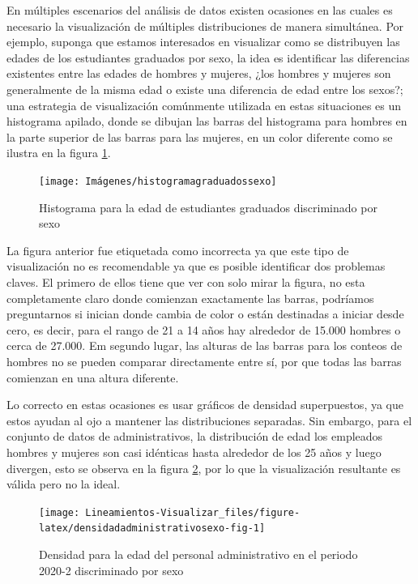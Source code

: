 \documentclass[
]{book}
\begin{document}
En múltiples escenarios del análisis de datos existen ocasiones en las cuales es necesario la visualización de múltiples distribuciones de manera simultánea. Por ejemplo, suponga que estamos interesados en visualizar como se distribuyen las edades de los estudiantes graduados por sexo, la idea es identificar las diferencias existentes entre las edades de hombres y mujeres, ¿los hombres y mujeres son generalmente de la misma edad o existe una diferencia de edad entre los sexos?; una estrategia de visualización comúnmente utilizada en estas situaciones es un histograma apilado, donde se dibujan las barras del histograma para hombres en la parte superior de las barras para las mujeres, en un color diferente como se ilustra en la figura \ref{fig:histogramagraduadossexo-fig}.

\begin{figure}

{\centering \texttt{[image: Imágenes/histogramagraduadossexo]} 

}

\caption{Histograma para la edad de estudiantes graduados discriminado por sexo}\label{fig:histogramagraduadossexo-fig}
\end{figure}

La figura anterior fue etiquetada como incorrecta ya que este tipo de visualización no es recomendable ya que es posible identificar dos problemas claves. El primero de ellos tiene que ver con solo mirar la figura, no esta completamente claro donde comienzan exactamente las barras, podríamos preguntarnos si inician donde cambia de color o están destinadas a iniciar desde cero, es decir, para el rango de 21 a 14 años hay alrededor de 15.000 hombres o cerca de 27.000. Em segundo lugar, las alturas de las barras para los conteos de hombres no se pueden comparar directamente entre sí, por que todas las barras comienzan en una altura diferente.

Lo correcto en estas ocasiones es usar gráficos de densidad superpuestos, ya que estos ayudan al ojo a mantener las distribuciones separadas. Sin embargo, para el conjunto de datos de administrativos, la distribución de edad los empleados hombres y mujeres son casi idénticas hasta alrededor de los 25 años y luego divergen, esto se observa en la figura \ref{fig:densidadadministrativosexo-fig}, por lo que la visualización resultante es válida pero no la ideal.

\begin{figure}

{\centering \texttt{[image: Lineamientos-Visualizar\_files/figure-latex/densidadadministrativosexo-fig-1]} 

}

\caption{Densidad para la edad del personal administrativo en el periodo 2020-2 discriminado por sexo}\label{fig:densidadadministrativosexo-fig}
\end{figure}
\end{document}
